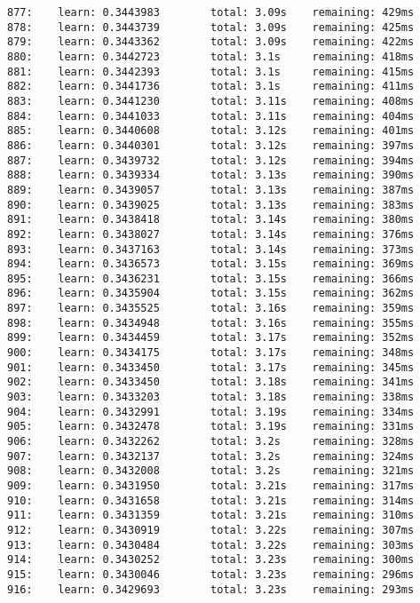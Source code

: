 \documentclass[11pt]{article}
\begin{document}
\begin{Verbatim}[commandchars=\\\{\}]
877:    learn: 0.3443983        total: 3.09s    remaining: 429ms
878:    learn: 0.3443739        total: 3.09s    remaining: 425ms
879:    learn: 0.3443362        total: 3.09s    remaining: 422ms
880:    learn: 0.3442723        total: 3.1s     remaining: 418ms
881:    learn: 0.3442393        total: 3.1s     remaining: 415ms
882:    learn: 0.3441736        total: 3.1s     remaining: 411ms
883:    learn: 0.3441230        total: 3.11s    remaining: 408ms
884:    learn: 0.3441033        total: 3.11s    remaining: 404ms
885:    learn: 0.3440608        total: 3.12s    remaining: 401ms
886:    learn: 0.3440301        total: 3.12s    remaining: 397ms
887:    learn: 0.3439732        total: 3.12s    remaining: 394ms
888:    learn: 0.3439334        total: 3.13s    remaining: 390ms
889:    learn: 0.3439057        total: 3.13s    remaining: 387ms
890:    learn: 0.3439025        total: 3.13s    remaining: 383ms
891:    learn: 0.3438418        total: 3.14s    remaining: 380ms
892:    learn: 0.3438027        total: 3.14s    remaining: 376ms
893:    learn: 0.3437163        total: 3.14s    remaining: 373ms
894:    learn: 0.3436573        total: 3.15s    remaining: 369ms
895:    learn: 0.3436231        total: 3.15s    remaining: 366ms
896:    learn: 0.3435904        total: 3.15s    remaining: 362ms
897:    learn: 0.3435525        total: 3.16s    remaining: 359ms
898:    learn: 0.3434948        total: 3.16s    remaining: 355ms
899:    learn: 0.3434459        total: 3.17s    remaining: 352ms
900:    learn: 0.3434175        total: 3.17s    remaining: 348ms
901:    learn: 0.3433450        total: 3.17s    remaining: 345ms
902:    learn: 0.3433450        total: 3.18s    remaining: 341ms
903:    learn: 0.3433203        total: 3.18s    remaining: 338ms
904:    learn: 0.3432991        total: 3.19s    remaining: 334ms
905:    learn: 0.3432478        total: 3.19s    remaining: 331ms
906:    learn: 0.3432262        total: 3.2s     remaining: 328ms
907:    learn: 0.3432137        total: 3.2s     remaining: 324ms
908:    learn: 0.3432008        total: 3.2s     remaining: 321ms
909:    learn: 0.3431950        total: 3.21s    remaining: 317ms
910:    learn: 0.3431658        total: 3.21s    remaining: 314ms
911:    learn: 0.3431359        total: 3.21s    remaining: 310ms
912:    learn: 0.3430919        total: 3.22s    remaining: 307ms
913:    learn: 0.3430484        total: 3.22s    remaining: 303ms
914:    learn: 0.3430252        total: 3.23s    remaining: 300ms
915:    learn: 0.3430046        total: 3.23s    remaining: 296ms
916:    learn: 0.3429693        total: 3.23s    remaining: 293ms

\end{Verbatim}
\end{document}
